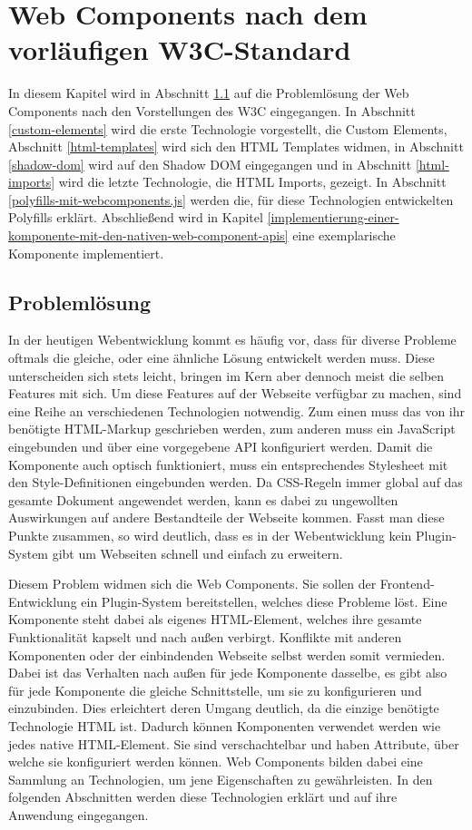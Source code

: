\chapter{Web Components nach dem vorläufigen W3C-Standard}\label{web-components-nach-w3c}

In diesem Kapitel wird in Abschnitt \ref{problemloesung} auf die Problemlösung der Web Components nach den Vorstellungen des \ac{W3C} eingegangen. In Abschnitt \ref{custom-elements} wird die erste Technologie vorgestellt, die Custom Elements, Abschnitt \ref{html-templates} wird sich den \ac{HTML} Templates widmen, in Abschnitt \ref{shadow-dom} wird auf den Shadow \ac{DOM} eingegangen und in Abschnitt \ref{html-imports} wird die letzte Technologie, die \ac{HTML} Imports, gezeigt. In Abschnitt \ref{polyfills-mit-webcomponents.js} werden die, für diese Technologien entwickelten Polyfills erklärt. Abschließend wird in Kapitel \ref{implementierung-einer-komponente-mit-den-nativen-web-component-apis} eine exemplarische Komponente implementiert.


\section{Problemlösung}\label{problemloesung}

In der heutigen Webentwicklung kommt es häufig vor, dass für diverse Probleme oftmals die gleiche, oder eine ähnliche Lösung entwickelt werden muss. Diese unterscheiden sich stets leicht, bringen im Kern aber dennoch meist die selben Features mit sich. Um diese Features auf der Webseite verfügbar zu machen, sind eine Reihe an verschiedenen Technologien notwendig. Zum einen muss das von ihr benötigte \ac{HTML}-Markup geschrieben werden, zum anderen muss ein JavaScript eingebunden und über eine vorgegebene \ac{API} konfiguriert werden. Damit die Komponente auch optisch funktioniert, muss ein entsprechendes Style\-sheet mit den Style-Definitionen eingebunden werden. Da \ac{CSS}-Regeln immer global auf das gesamte Dokument angewendet werden, kann es dabei zu ungewollten Auswirkungen auf andere Bestandteile der Webseite kommen. Fasst man diese Punkte zusammen, so wird deutlich, dass es in der Webentwicklung kein Plugin-System gibt um Webseiten schnell und einfach zu erweitern.

Diesem Problem widmen sich die Web Components. Sie sollen der Frontend-Ent\-wick\-lung ein Plugin-System bereitstellen, welches diese Probleme löst. Eine Komponente steht dabei als eigenes \ac{HTML}-Element, welches ihre gesamte Funktionalität kapselt und nach außen verbirgt. Konflikte mit anderen Komponenten oder der einbindenden Webseite selbst werden somit vermieden. Dabei ist das Verhalten nach außen für jede Komponente dasselbe, es gibt also für jede Komponente die gleiche Schnittstelle, um sie zu konfigurieren und einzubinden. Dies erleichtert deren Umgang deutlich, da die einzige benötigte Technologie \ac{HTML} ist. Dadurch können Komponenten verwendet werden wie jedes native \ac{HTML}-Element. Sie sind verschachtelbar und haben Attribute, über welche sie konfiguriert werden können. Web Components bilden dabei eine Sammlung an Technologien, um jene Eigenschaften zu gewährleisten. In den folgenden Abschnitten werden diese Technologien erklärt und auf ihre Anwendung eingegangen.
